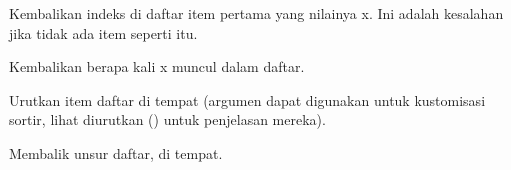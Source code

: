 Kembalikan indeks di daftar item pertama yang nilainya x. Ini adalah kesalahan jika tidak ada item seperti itu. 
 
Kembalikan berapa kali x muncul dalam daftar.

Urutkan item daftar di tempat (argumen dapat digunakan untuk kustomisasi sortir, lihat diurutkan () untuk penjelasan mereka).

Membalik unsur daftar, di tempat. 

